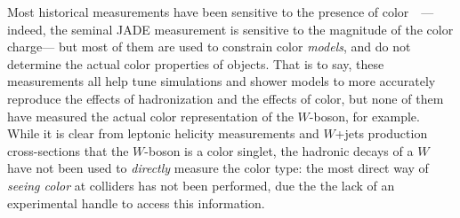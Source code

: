 

Most historical measurements have been sensitive to the presence of color~~\cite{tasso,pep,PhysRevLett54270,PhysRevLett57945,PhysRevLett571398,PhysRevD.50.5562,Abbott:1997bk,Chatrchyan:2013fha,Achard:2003pe,Abdallah:2006uq}--- indeed, the seminal JADE measurement is sensitive to the magnitude of the color charge--- but most of them are used to constrain color \textit{models}, and do not determine the actual color properties of objects. That is to say, these measurements all help tune simulations and shower models to more accurately reproduce the effects of hadronization and the effects of color, but none of them have measured the actual color representation of the $W$-boson, for example. While it is clear from leptonic helicity measurements and $W$+jets production cross-sections that the $W$-boson is a color singlet, the hadronic decays of a $W$ have not been used to \textit{directly} measure the color type: the most direct way of \textit{seeing color} at colliders has not been performed, due the the lack of an experimental handle to access this information.

